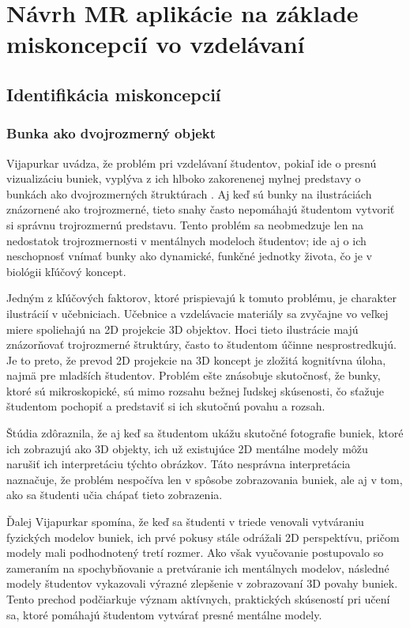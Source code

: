 \section{Návrh MR aplikácie na základe miskoncepcií vo vzdelávaní}
\subsection{Identifikácia miskoncepcií}
\subsubsection{Bunka ako dvojrozmerný objekt}
Vijapurkar uvádza, že problém pri vzdelávaní študentov, pokiaľ ide o presnú vizualizáciu buniek, vyplýva z ich hlboko zakorenenej mylnej predstavy o bunkách ako dvojrozmerných 
štruktúrach \cite{vijapurkarWhatCellsReally2014}. Aj keď sú bunky na ilustráciách znázornené ako trojrozmerné, tieto snahy často nepomáhajú študentom vytvoriť si správnu trojrozmernú 
predstavu. Tento problém sa neobmedzuje len na nedostatok trojrozmernosti v mentálnych modeloch študentov; ide aj o ich neschopnosť vnímať bunky ako dynamické, funkčné jednotky života, 
čo je v biológii kľúčový koncept.

Jedným z kľúčových faktorov, ktoré prispievajú k tomuto problému, je charakter ilustrácií v učebniciach. Učebnice a vzdelávacie materiály sa zvyčajne vo veľkej miere spoliehajú na 2D 
projekcie 3D objektov. Hoci tieto ilustrácie majú znázorňovať trojrozmerné štruktúry, často to študentom účinne nesprostredkujú. Je to preto, že prevod 2D projekcie na 3D koncept je 
zložitá kognitívna úloha, najmä pre mladších študentov. Problém ešte znásobuje skutočnosť, že bunky, ktoré sú mikroskopické, sú mimo rozsahu bežnej ľudskej skúsenosti, čo sťažuje študentom 
pochopiť a predstaviť si ich skutočnú povahu a rozsah.

Štúdia zdôraznila, že aj keď sa študentom ukážu skutočné fotografie buniek, ktoré ich zobrazujú ako 3D objekty, ich už existujúce 2D mentálne modely môžu narušiť ich interpretáciu týchto 
obrázkov. Táto nesprávna interpretácia naznačuje, že problém nespočíva len v spôsobe zobrazovania buniek, ale aj v tom, ako sa študenti učia chápať tieto zobrazenia.

Ďalej Vijapurkar spomína, že keď sa študenti v triede venovali vytváraniu fyzických modelov buniek, ich prvé pokusy stále odrážali 2D perspektívu, pričom modely mali podhodnotený 
tretí rozmer. Ako však vyučovanie postupovalo so zameraním na spochybňovanie a pretváranie ich mentálnych modelov, následné modely študentov vykazovali výrazné zlepšenie v zobrazovaní 
3D povahy buniek. Tento prechod podčiarkuje význam aktívnych, praktických skúseností pri učení sa, ktoré pomáhajú študentom vytvárať presné mentálne modely.

